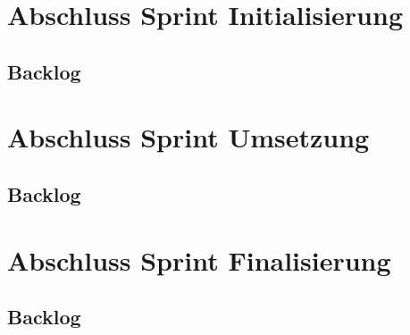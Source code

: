 \section{Abschluss Sprint Initialisierung}
\subsection{Backlog}

\section{Abschluss Sprint Umsetzung}
\subsection{Backlog}

\section{Abschluss Sprint Finalisierung}
\subsection{Backlog}


